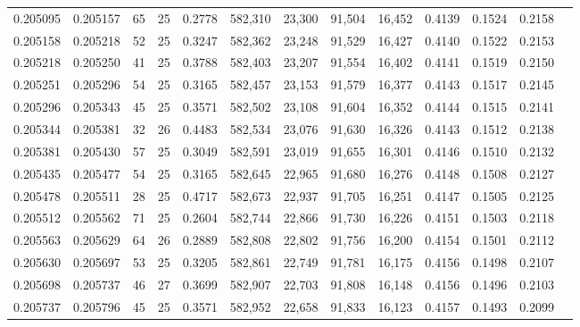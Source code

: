 \begin{tabular}{rrrrrrrrrrrrr}
0.205095 & 0.205157 &  65 &  25 &                                     0.2778 & 582,310 &  23,300 &  91,504 &  16,452 & 0.4139 & 0.1524 & 0.2158 \\
0.205158 & 0.205218 &  52 &  25 &                                     0.3247 & 582,362 &  23,248 &  91,529 &  16,427 & 0.4140 & 0.1522 & 0.2153 \\
0.205218 & 0.205250 &  41 &  25 &                                     0.3788 & 582,403 &  23,207 &  91,554 &  16,402 & 0.4141 & 0.1519 & 0.2150 \\
0.205251 & 0.205296 &  54 &  25 &                                     0.3165 & 582,457 &  23,153 &  91,579 &  16,377 & 0.4143 & 0.1517 & 0.2145 \\
0.205296 & 0.205343 &  45 &  25 &                                     0.3571 & 582,502 &  23,108 &  91,604 &  16,352 & 0.4144 & 0.1515 & 0.2141 \\
0.205344 & 0.205381 &  32 &  26 &                                     0.4483 & 582,534 &  23,076 &  91,630 &  16,326 & 0.4143 & 0.1512 & 0.2138 \\
0.205381 & 0.205430 &  57 &  25 &                                     0.3049 & 582,591 &  23,019 &  91,655 &  16,301 & 0.4146 & 0.1510 & 0.2132 \\
0.205435 & 0.205477 &  54 &  25 &                                     0.3165 & 582,645 &  22,965 &  91,680 &  16,276 & 0.4148 & 0.1508 & 0.2127 \\
0.205478 & 0.205511 &  28 &  25 &                                     0.4717 & 582,673 &  22,937 &  91,705 &  16,251 & 0.4147 & 0.1505 & 0.2125 \\
0.205512 & 0.205562 &  71 &  25 &                                     0.2604 & 582,744 &  22,866 &  91,730 &  16,226 & 0.4151 & 0.1503 & 0.2118 \\
0.205563 & 0.205629 &  64 &  26 &                                     0.2889 & 582,808 &  22,802 &  91,756 &  16,200 & 0.4154 & 0.1501 & 0.2112 \\
0.205630 & 0.205697 &  53 &  25 &                                     0.3205 & 582,861 &  22,749 &  91,781 &  16,175 & 0.4156 & 0.1498 & 0.2107 \\
0.205698 & 0.205737 &  46 &  27 &                                     0.3699 & 582,907 &  22,703 &  91,808 &  16,148 & 0.4156 & 0.1496 & 0.2103 \\
0.205737 & 0.205796 &  45 &  25 &                                     0.3571 & 582,952 &  22,658 &  91,833 &  16,123 & 0.4157 & 0.1493 & 0.2099 \\

\end{tabular}
